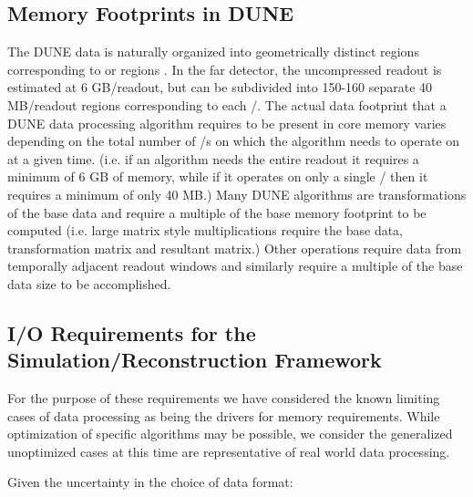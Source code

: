 \documentclass[../main-v1.tex]{subfiles}
\begin{document}

\subsection{Memory Footprints in DUNE}
The DUNE  data is naturally organized into geometrically distinct regions corresponding to  or  regions .  In the far detector, the uncompressed readout is estimated at 6 GB/readout, but can be subdivided into 150-160 separate 40 MB/readout regions corresponding to each /.  The actual data footprint that a DUNE data processing algorithm requires to be present in core memory varies depending on the total number of /s on which the algorithm needs to operate on at a given time.  (i.e. if an algorithm needs the entire readout it requires a minimum of 6 GB of memory, while if it operates on only a single / then it requires a minimum of only 40 MB.)   Many DUNE algorithms are transformations of the base data and require a multiple of the base memory footprint to be computed (i.e. large matrix style multiplications require the base data, transformation matrix and resultant matrix.)  Other operations require data from temporally adjacent readout windows and similarly require a multiple of the base data size to be accomplished.

\subsection{I/O Requirements for the Simulation/Reconstruction Framework}

For the purpose of these requirements we have considered the known limiting cases of data processing as being the drivers for memory requirements.  While optimization of specific algorithms may be possible, we consider the generalized unoptimized cases at this time are representative of real world data processing.

Given the uncertainty in the choice of data format:
\end{document}
